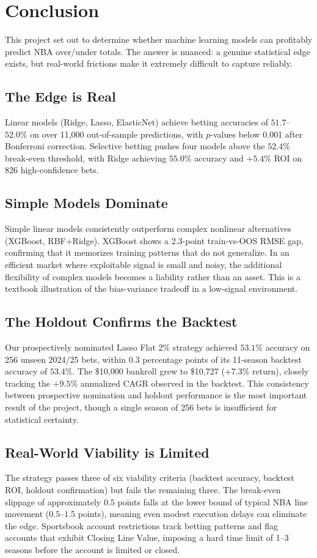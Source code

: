 \documentclass[11pt]{extarticle}
\begin{document}
\section{Conclusion}
This project set out to determine whether machine learning models can profitably predict NBA over/under totals. The
answer is nuanced: a genuine statistical edge exists, but real-world frictions make it extremely difficult to capture
reliably.

\subsection{The Edge is Real}
Linear models (Ridge, Lasso, ElasticNet) achieve betting accuracies of $51.7$–$52.0\%$ on over 11,000 out-of-sample
predictions, with $p$-values below 0.001 after Bonferroni correction. Selective betting pushes four models above the
$52.4\%$ break-even threshold, with Ridge achieving $55.0\%$ accuracy and $+5.4\%$ ROI on 826 high-confidence bets.

\subsection{Simple Models Dominate}
Simple linear models consistently outperform complex nonlinear alternatives (XGBoost, RBF+Ridge). XGBoost
shows a 2.3-point train-vs-OOS RMSE gap, confirming that it memorizes training patterns that do not generalize. In
an efficient market where exploitable signal is small and noisy, the additional flexibility of complex models becomes a
liability rather than an asset. This is a textbook illustration of the bias-variance tradeoff in a low-signal environment.

\subsection{The Holdout Confirms the Backtest}
Our prospectively nominated Lasso Flat 2\% strategy achieved $53.1\%$ accuracy on 256 unseen 2024/25 bets, within
0.3 percentage points of its 11-season backtest accuracy of $53.4\%$. The \$10,000 bankroll grew to \$10,727 ($+7.3\%$
return), closely tracking the $+9.5\%$ annualized CAGR observed in the backtest. This consistency between
prospective nomination and holdout performance is the most important result of the project, though a single season
of 256 bets is insufficient for statistical certainty.

\subsection{Real-World Viability is Limited}
The strategy passes three of six viability criteria (backtest accuracy, backtest ROI, holdout confirmation) but fails the
remaining three. The break-even slippage of approximately $0.5$ points falls at the lower bound of typical NBA line
movement ($0.5$–$1.5$ points), meaning even modest execution delays can eliminate the edge. Sportsbook account
restrictions track betting patterns and flag accounts that exhibit Closing Line Value, imposing a hard time limit of 1–3
seasons before the account is limited or closed.
\end{document}
